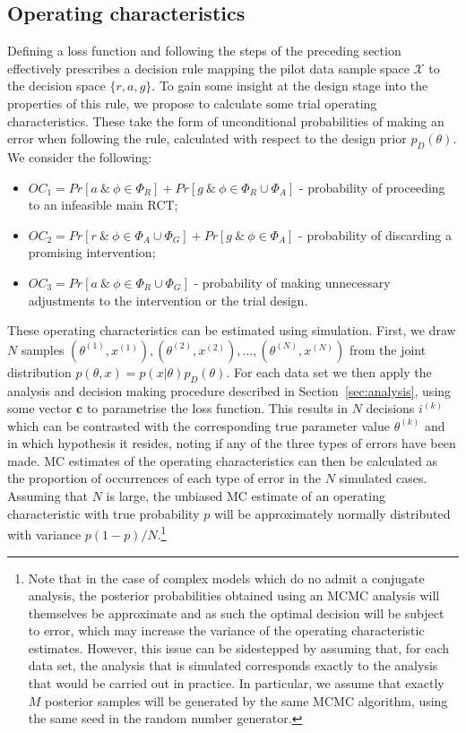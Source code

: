 \documentclass[AMA,STIX1COL]{WileyNJD-v2}
\begin{document}
\subsection{Operating characteristics}\label{sec:evaluation}

Defining a loss function and following the steps of the preceding section effectively prescribes a decision rule mapping the pilot data sample space $\mathcal{X}$ to the decision space $\{r, a, g\}$. To gain some insight at the design stage into the properties of this rule, we propose to calculate some trial operating characteristics. These take the form of unconditional probabilities of making an error when following the rule, calculated with respect to the design prior $p_D(\theta)$. We consider the following:
\begin{itemize}
\item $OC_1 = Pr[a ~\&~ \phi \in \Phi_R] + Pr[g ~\&~ \phi \in \Phi_R \cup \Phi_A]$ - probability of proceeding to an infeasible main RCT;
\item $OC_2 = Pr[r ~\&~ \phi \in \Phi_A \cup \Phi_G] + Pr[g ~\&~ \phi \in \Phi_A]$ - probability of discarding a promising intervention;
\item $OC_3 = Pr[a ~\&~ \phi \in \Phi_R \cup \Phi_G]$ - probability of making unnecessary adjustments to the intervention or the trial design.
\end{itemize}

These operating characteristics can be estimated using simulation. First, we draw $N$ samples $(\theta^{(1)}, x^{(1)}), (\theta^{(2)}, x^{(2)}), \ldots , (\theta^{(N)}, x^{(N)})$ from the joint distribution $p(\theta, x) = p(x | \theta)p_D(\theta)$. For each data set we then apply the analysis and decision making procedure described in Section~\ref{sec:analysis}, using some vector $\mathbf{c}$ to parametrise the loss function. This results in $N$ decisions $i^{(k)}$ which can be contrasted with the corresponding true parameter value $\theta^{(k)}$ and in which hypothesis it resides, noting if any of the three types of errors have been made. MC estimates of the operating characteristics can then be calculated as the proportion of occurrences of each type of error in the $N$ simulated cases. Assuming that $N$ is large, the unbiased MC estimate of an operating characteristic with true probability $p$ will be approximately normally distributed with variance $p(1-p)/N$.\footnote{Note that in the case of complex models which do no admit a conjugate analysis, the posterior probabilities obtained using an MCMC analysis will themselves be approximate and as such the optimal decision will be subject to error, which may increase the variance of the operating characteristic estimates. However, this issue can be sidestepped by assuming that, for each data set, the analysis that is simulated corresponds exactly to the analysis that would be carried out in practice. In particular, we assume that exactly $M$ posterior samples will be generated by the same MCMC algorithm, using the same seed in the random number generator.}
\end{document}
